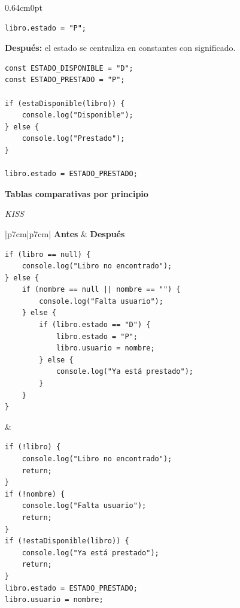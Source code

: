 \documentclass[12pt,letterpaper]{article}
\begin{document}
\begin{adjustwidth}{0.64cm}{0pt}
\begin{lstlisting}[caption={Antes: strings mágicos}]
libro.estado = "P";
\end{lstlisting}

\textbf{Después:} el estado se centraliza en constantes con significado.

\begin{lstlisting}[caption={Después: constantes semánticas}]
const ESTADO_DISPONIBLE = "D";
const ESTADO_PRESTADO = "P";

if (estaDisponible(libro)) {
    console.log("Disponible");
} else {
    console.log("Prestado");
}

libro.estado = ESTADO_PRESTADO;
\end{lstlisting}

\vspace{8pt}
\textbf{Tablas comparativas por principio}
\vspace{4pt}

\lstset{numbers=none, frame=none, aboveskip=0pt, belowskip=0pt}

\vspace{6pt}
\textit{KISS}
\vspace{2pt}

\begin{table}[H]
\centering
\small
\renewcommand{\arraystretch}{1.4}
\caption{KISS: código Antes y Después}
\begin{tabular}{|p{7cm}|p{7cm}|}
\hline
\textbf{Antes} & \textbf{Después} \\
\hline
\begin{minipage}[t]{\linewidth}
\vspace{2pt}
\begin{lstlisting}
if (libro == null) {
    console.log("Libro no encontrado");
} else {
    if (nombre == null || nombre == "") {
        console.log("Falta usuario");
    } else {
        if (libro.estado == "D") {
            libro.estado = "P";
            libro.usuario = nombre;
        } else {
            console.log("Ya está prestado");
        }
    }
}
\end{lstlisting}
\vspace{2pt}
\end{minipage}
& \begin{minipage}[t]{\linewidth}
\vspace{2pt}
\begin{lstlisting}
if (!libro) {
    console.log("Libro no encontrado");
    return;
}
if (!nombre) {
    console.log("Falta usuario");
    return;
}
if (!estaDisponible(libro)) {
    console.log("Ya está prestado");
    return;
}
libro.estado = ESTADO_PRESTADO;
libro.usuario = nombre;
\end{lstlisting}
\vspace{2pt}
\end{minipage} \\
\hline
{} \\
\hline
\end{tabular}
\end{table}


\end{adjustwidth}
\end{document}
